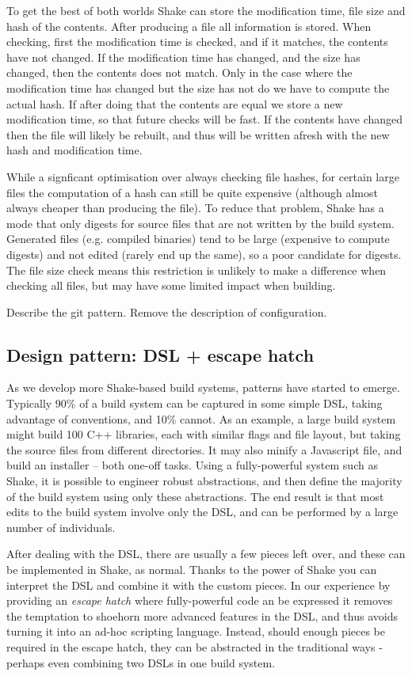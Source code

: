 To get the best of both worlds Shake can store the modification time, file size and hash of the contents. After producing a file all information is stored. When checking, first the modification time is checked, and if it matches, the contents have not changed. If the modification time has changed, and the size has changed, then the contents does not match. Only in the case where the modification time has changed but the size has not do we have to compute the actual hash. If after doing that the contents are equal we store a new modification time, so that future checks will be fast. If the contents have changed then the file will likely be rebuilt, and thus will be written afresh with the new hash and modification time.

While a signficant optimisation over always checking file hashes, for certain large files the computation of a hash can still be quite expensive (although almost always cheaper than producing the file). To reduce that problem, Shake has a mode that only digests for source files that are not written by the build system. Generated files (e.g. compiled binaries) tend to be large (expensive to compute digests) and not edited (rarely end up the same), so a poor candidate for digests. The file size check means this restriction is unlikely to make a difference when checking all files, but may have some limited impact when building.

Describe the git pattern. Remove the description of configuration.

\subsection{Design pattern: DSL + escape hatch}


As we develop more Shake-based build systems, patterns have started to emerge. Typically 90\% of a build system can be captured in some simple DSL, taking advantage of conventions, and 10\% cannot. As an example, a large build system might build 100 C++ libraries, each with similar flags and file layout, but taking the source files from different directories. It may also minify a Javascript file, and build an installer -- both one-off tasks. Using a fully-powerful system such as Shake, it is possible to engineer robust abstractions, and then define the majority of the build system using only these abstractions. The end result is that most edits to the build system involve only the DSL, and can be performed by a large number of individuals.

After dealing with the DSL, there are usually a few pieces left over, and these can be implemented in Shake, as normal. Thanks to the power of Shake you can interpret the DSL and combine it with the custom pieces. In our experience by providing an \textit{escape hatch} where fully-powerful code an be expressed it removes the temptation to shoehorn more advanced features in the DSL, and thus avoids turning it into an ad-hoc scripting language. Instead, should enough pieces be required in the escape hatch, they can be abstracted in the traditional ways - perhaps even combining two DSLs in one build system.
